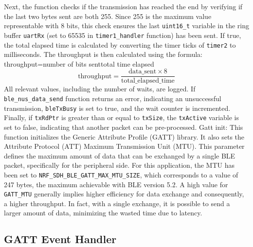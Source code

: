 \documentclass{Configuration_Files/PoliMi3i_thesis}
\begin{document}
Next, the function checks if the transmission has reached the end by verifying if the last two bytes sent are both 255. Since 255 is the maximum value representable with 8 bits, this check ensures the last \texttt{uint16\_t} variable in the ring buffer \texttt{uartRx} (set to 65535 in \texttt{timer1\_handler} function) has been sent. If true, the total elapsed time is calculated by converting the timer ticks of \texttt{timer2} to milliseconds. The throughput is then calculated using the formula: throughput=number of bits senttotal time elapsed
\[
\text{throughput} = \frac{\text{data\_sent} \times 8}{\text{total\_elapsed\_time}}
\]
All relevant values, including the number of waits, are logged. If \texttt{ble\_nus\_data\_send} function returns an error, indicating an unsuccessful transmission, \texttt{bleTxBusy} is set to true, and the wait counter is incremented. Finally, if \texttt{txRdPtr} is greater than or equal to \texttt{txSize}, the \texttt{txActive} variable is set to false, indicating that another packet can be pre-processed.
Gatt init: This function initializes the Generic Attribute Profile (GATT) library. It also sets the Attribute Protocol (ATT) Maximum Transmission Unit (MTU). This parameter defines the maximum amount of data that can be exchanged by a single BLE packet, specifically for the peripheral side. For this application, the MTU has been set to \texttt{NRF\_SDH\_BLE\_GATT\_MAX\_MTU\_SIZE}, which corresponds to a value of 247 bytes, the maximum achievable with BLE version 5.2. A high value for \texttt{GATT\_MTU} generally implies higher efficiency for data exchange and consequently, a higher throughput. In fact, with a single exchange, it is possible to send a larger amount of data, minimizing the wasted time due to latency.

\subsection*{GATT Event Handler}
\end{document}
